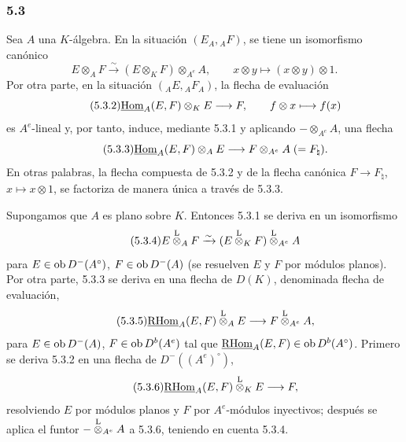 \subsubsection*{5.3}

Sea $A$ una $K$-álgebra. En la situación $(E_A,{}_AF)$, se tiene un isomorfismo canónico
\begin{equation}\tag{5.3.1}
E\otimes_AF\xrightarrow{\sim}(E\otimes_KF)\otimes_{A^e}A,
\qquad x\otimes y\longmapsto (x\otimes y)\otimes 1.
\end{equation}
Por otra parte, en la situación $({}_AE,{}_AF_A)$, la flecha de evaluación
\begin{equation}\tag{5.3.2}
\underline{\operatorname{Hom}}_A(E,F)\otimes_KE\longrightarrow F,
\qquad f\otimes x\longmapsto f(x)
\end{equation}
es $A^e$-lineal y, por tanto, induce, mediante 5.3.1 y aplicando $-\otimes_{A^e}A$, una flecha
\begin{equation}\tag{5.3.3}
\underline{\operatorname{Hom}}_A(E,F)\otimes_AE\longrightarrow F\otimes_{A^e}A\;(=F_\natural).
\end{equation}
En otras palabras, la flecha compuesta de 5.3.2 y de la flecha canónica $F\to F_\natural$, $x\mapsto x\otimes 1$, se factoriza de manera única a través de 5.3.3.

Supongamos que $A$ es plano sobre $K$. Entonces 5.3.1 se deriva en un isomorfismo
\begin{equation}\tag{5.3.4}
E\overset{\mathrm L}{\otimes}_AF\xrightarrow{\sim}(E\overset{\mathrm L}{\otimes}_KF)\overset{\mathrm L}{\otimes}_{A^e}A
\end{equation}
para $E\in\operatorname{ob} D^-(A^\circ)$, $F\in\operatorname{ob} D^-(A)$ (se resuelven $E$ y $F$ por módulos planos). Por otra parte, 5.3.3 se deriva en una flecha de $D(K)$, denominada flecha de evaluación,
\begin{equation}\tag{5.3.5}
\underline{\mathrm{RHom}}_A(E,F)\overset{\mathrm L}{\otimes}_AE\longrightarrow F\overset{\mathrm L}{\otimes}_{A^e}A,
\end{equation}
para $E\in\operatorname{ob} D^-(A)$, $F\in\operatorname{ob} D^b(A^e)$ tal que $\underline{\mathrm{RHom}}_A(E,F)\in\operatorname{ob} D^b(A^\circ)$. Primero se deriva 5.3.2 en una flecha de $D^-((A^e)^\circ)$,
\begin{equation}\tag{5.3.6}
\underline{\mathrm{RHom}}_A(E,F)\overset{\mathrm L}{\otimes}_KE\longrightarrow F,
\end{equation}
resolviendo $E$ por módulos planos y $F$ por $A^e$-módulos inyectivos; después se aplica el funtor $-\overset{\mathrm L}{\otimes}_{A^e}A$ a 5.3.6, teniendo en cuenta 5.3.4.
